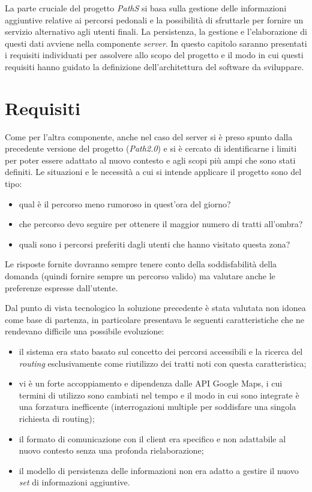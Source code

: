 La parte cruciale del progetto \emph{PathS} si basa sulla gestione delle informazioni aggiuntive relative ai percorsi pedonali e la possibilità di sfruttarle per fornire un servizio alternativo agli utenti finali. La persistenza, la gestione e l'elaborazione di questi dati avviene nella componente \emph{server}. 
In questo capitolo saranno presentati i requisiti individuati per assolvere allo scopo del progetto e il modo in cui questi requisiti hanno guidato la definizione dell'architettura del software da sviluppare.

\section{Requisiti}
Come per l'altra componente, anche nel caso del server si è preso spunto dalla precedente versione del progetto (\emph{Path2.0}) e si è cercato di identificarne i limiti per poter essere adattato al nuovo contesto e agli scopi più ampi che sono stati definiti. Le situazioni e le necessità a cui si intende applicare il progetto sono del tipo:
\begin{itemize}
\item qual è il percorso meno rumoroso in quest’ora del giorno?
\item che percorso devo seguire per ottenere il maggior numero di tratti all’ombra?
\item quali sono i percorsi preferiti dagli utenti che hanno visitato questa zona?
\end{itemize}
Le risposte fornite dovranno sempre tenere conto della soddisfabilità della domanda (quindi fornire sempre un percorso valido) ma valutare anche le preferenze espresse dall’utente.

Dal punto di vista tecnologico la soluzione precedente è stata valutata non idonea come base di partenza, in particolare presentava le seguenti caratteristiche che ne rendevano difficile una possibile evoluzione:
\begin{itemize}
\item il sistema era stato basato sul concetto dei percorsi accessibili e la ricerca del \emph{routing} esclusivamente come riutilizzo dei tratti noti con questa caratteristica;
\item vi è un forte accoppiamento e dipendenza dalle API Google Maps, i cui termini di utilizzo sono cambiati nel tempo e il modo in cui sono integrate è una forzatura inefficente (interrogazioni multiple per soddisfare una singola richiesta di routing);
\item il formato di comunicazione con il client era specifico e non adattabile al nuovo contesto senza una profonda rielaborazione;
\item il modello di persistenza delle informazioni non era adatto a gestire il nuovo \emph{set} di informazioni aggiuntive.
\end{itemize}

